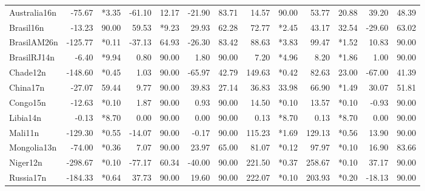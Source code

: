 \begin{landscape}
\begin{table}[htb]
\begin{tabular}{@{}l|rr|rr|rr|rr|rr|rr@{}}
Australia16n&-75.67&*3.35&-61.10&12.17&-21.90&83.71&14.57&90.00&53.77&20.88&39.20&48.39\\
Brasil16n&-13.23&90.00&59.53&*9.23&29.93&62.28&72.77&*2.45&43.17&32.54&-29.60&63.02\\
BrasilAM26n&-125.77&*0.11&-37.13&64.93&-26.30&83.42&88.63&*3.83&99.47&*1.52&10.83&90.00\\
BrasilRJ14n&-6.40&*9.94&0.80&90.00&1.80&90.00&7.20&*4.96&8.20&*1.86&1.00&90.00\\
Chade12n&-148.60&*0.45&1.03&90.00&-65.97&42.79&149.63&*0.42&82.63&23.00&-67.00&41.39\\
China17n&-27.07&59.44&9.77&90.00&39.83&27.14&36.83&33.98&66.90&*1.49&30.07&51.81\\
Congo15n&-12.63&*0.10&1.87&90.00&0.93&90.00&14.50&*0.10&13.57&*0.10&-0.93&90.00\\
Libia14n&-0.13&*8.70&0.00&90.00&0.00&90.00&0.13&*8.70&0.13&*8.70&0.00&90.00\\
Mali11n&-129.30&*0.55&-14.07&90.00&-0.17&90.00&115.23&*1.69&129.13&*0.56&13.90&90.00\\
Mongolia13n&-74.00&*0.36&7.07&90.00&23.97&65.00&81.07&*0.12&97.97&*0.10&16.90&83.66\\
Niger12n&-298.67&*0.10&-77.17&60.34&-40.00&90.00&221.50&*0.37&258.67&*0.10&37.17&90.00\\
Russia17n&-184.33&*0.64&37.73&90.00&19.60&90.00&222.07&*0.10&203.93&*0.20&-18.13&90.00\\
\bottomrule
\end{tabular}
\end{table}
\end{landscape}
